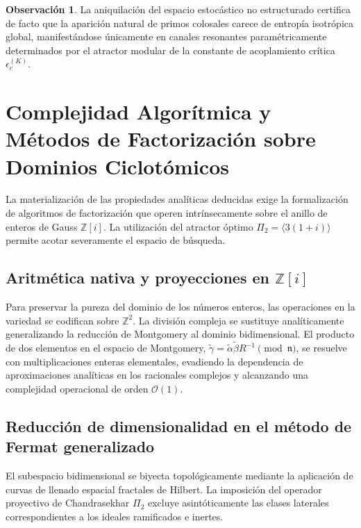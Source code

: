 \documentclass{article}
\numberwithin{equation}{section}
\theoremstyle{plain}
\theoremstyle{definition}
\newtheorem{observacion}[teorema]{Observación}
\begin{document}
\begin{observacion}
La aniquilación del espacio estocástico no estructurado certifica de facto que la aparición natural de primos colosales carece de entropía isotrópica global, manifestándose únicamente en canales resonantes paramétricamente determinados por el atractor modular de la constante de acoplamiento crítica $\epsilon_c^{(K)}$.
\end{observacion}

\section{Complejidad Algorítmica y Métodos de Factorización sobre Dominios Ciclotómicos}
\label{sec:implementacion}

La materialización de las propiedades analíticas deducidas exige la formalización de algoritmos de factorización que operen intrínsecamente sobre el anillo de enteros de Gauss $\mathbb{Z}[i]$. La utilización del atractor óptimo $\Pi_2 = \langle 3(1+i) \rangle$ permite acotar severamente el espacio de búsqueda.

\subsection{Aritmética nativa y proyecciones en \texorpdfstring{$\mathbb{Z}[i]$}{Z[i]}}

Para preservar la pureza del dominio de los números enteros, las operaciones en la variedad se codifican sobre $\mathbb{Z}^2$. La división compleja se sustituye analíticamente generalizando la reducción de Montgomery al dominio bidimensional. El producto de dos elementos en el espacio de Montgomery, $\tilde{\gamma} = \tilde{\alpha} \tilde{\beta} R^{-1} \pmod{\mathfrak{n}}$, se resuelve con multiplicaciones enteras elementales, evadiendo la dependencia de aproximaciones analíticas en los racionales complejos y alcanzando una complejidad operacional de orden $\mathcal{O}(1)$.

\subsection{Reducción de dimensionalidad en el método de Fermat generalizado}

El subespacio bidimensional se biyecta topológicamente mediante la aplicación de curvas de llenado espacial fractales de Hilbert. La imposición del operador proyectivo de Chandrasekhar $\Pi_2$ excluye asintóticamente las clases laterales correspondientes a los ideales ramificados e inertes. 
\end{document}
